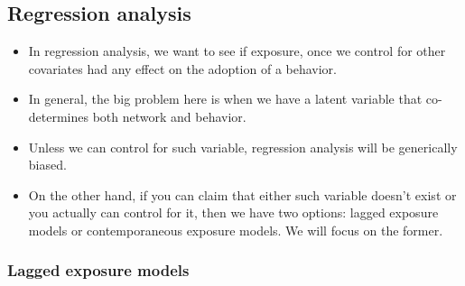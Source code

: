 \documentclass[
]{book}
\begin{document}
\hypertarget{regression-analysis}{%
\subsection{Regression analysis}\label{regression-analysis}}

\begin{itemize}
\item
  In regression analysis, we want to see if exposure, once we control for other
  covariates had any effect on the adoption of a behavior.
\item
  In general, the big problem here is when we have a latent variable that
  co-determines both network and behavior.
\item
  Unless we can control for such variable, regression analysis will be
  generically biased.
\item
  On the other hand, if you can claim that either such variable doesn't exist
  or you actually can control for it, then we have two options: lagged exposure
  models or contemporaneous exposure models. We will focus on the former.
\end{itemize}

\hypertarget{lagged-exposure-models}{%
\subsubsection{Lagged exposure models}\label{lagged-exposure-models}}
\end{document}
